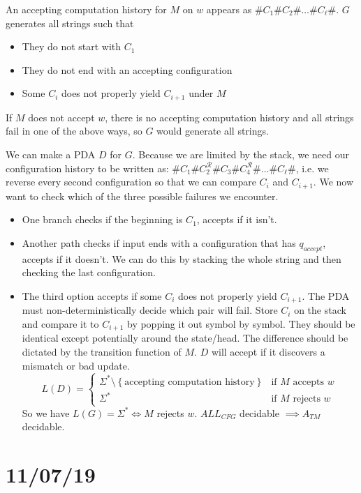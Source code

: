 \documentclass[12 pt]{article}
\begin{document}
An accepting computation history for $M$ on $w$ appears as $\# C_1 \#
C_2 \# \ldots \# C_\ell \#$. $G$ generates all strings such that
\begin{itemize}
\item They do not start with $C_1$
\item They do not end with an accepting configuration
\item Some $C_i$ does not properly yield $C_{i+1}$ under $M$
\end{itemize}
If $M$ does not accept $w$, there is no accepting computation history
and all strings fail in one of the above ways, so $G$ would generate
all strings.

We can make a PDA $D$ for $G$. Because we are limited by the stack, we
need our configuration history to be written as: $\# C_1 \#
C_2^{\mathcal{R}} \# C_3 \# C_4^{\mathcal{R}}\# \ldots \# C_\ell \#$,
i.e. we reverse every second configuration so that we can compare
$C_i$ and $C_{i+1}$. We now want to check which of the three possible
failures we encounter.
\begin{itemize}
\item One branch checks if the beginning is $C_1$, accepts if it
  isn't.
\item Another path checks if input ends with a configuration that has
  $q_{accept}$, accepts if it doesn't. We can do this by stacking the
  whole string and then checking the last configuration.
\item The third option accepts if some $C_i$ does not properly yield
  $C_{i+1}$. The PDA must non-deterministically decide which pair will
  fail. Store $C_i$ on the stack and compare it to $C_{i+1}$ by
  popping it out symbol by symbol. They should be identical except
  potentially around the state/head. The difference should be dictated
  by the transition function of $M$. $D$ will accept if it
  discovers a mismatch or bad update.
  $$L(D) =
  \begin{cases}
    \Sigma^* \setminus \left\{\text{accepting computation
        history}\right\} & \text{if }M \text{ accepts }w
    \\ \Sigma^* & \text{if }M \text{ rejects }w
  \end{cases}
  $$
  So we have $L(G) = \Sigma^* \iff M$ rejects $w$. $ALL_{CFG}$
  decidable $\implies A_{TM}$ decidable.
\end{itemize}
\section{11/07/19}
\end{document}
